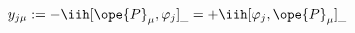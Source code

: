 \begin{equation}	\label{12.126new}
y_{j\mu}
:= - \iih [\ope{P}_\mu,\varphi_j]_{\_}
 = + \iih [\varphi_j,\ope{P}_\mu]_{\_}
	\end{equation}


